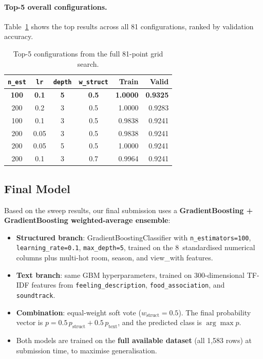 \documentclass[11pt,letterpaper]{article}
\begin{document}
\paragraph{Top-5 overall configurations.}
Table~\ref{tab:top5} shows the top results across all 81 configurations, ranked
by validation accuracy.

\begin{table}[H]
\centering
\caption{Top-5 configurations from the full 81-point grid search.}
\label{tab:top5}
\begin{tabular}{ccccrr}
\toprule
\texttt{n\_est} & \texttt{lr} & \texttt{depth} & \texttt{w\_struct} & \textbf{Train} & \textbf{Valid}\\
\midrule
\textbf{100} & \textbf{0.1} & \textbf{5} & \textbf{0.5} & \textbf{1.0000} & \textbf{0.9325}\\
200  & 0.2  & 3 & 0.5  & 1.0000 & 0.9283 \\
100  & 0.1  & 3 & 0.5  & 0.9838 & 0.9241 \\
200  & 0.05 & 3 & 0.5  & 0.9838 & 0.9241 \\
200  & 0.05 & 5 & 0.5  & 1.0000 & 0.9241 \\
200  & 0.1  & 3 & 0.7  & 0.9964 & 0.9241 \\
\bottomrule
\end{tabular}
\end{table}

\subsection{Final Model}

Based on the sweep results, our final submission uses a
\textbf{GradientBoosting + GradientBoosting weighted-average ensemble}:

\begin{itemize}
  \item \textbf{Structured branch}: GradientBoostingClassifier with
        \texttt{n\_estimators=100}, \texttt{learning\_rate=0.1}, \texttt{max\_depth=5},
        trained on the 8~standardised numerical columns plus multi-hot room, season,
        and view\_with features.
  \item \textbf{Text branch}: same GBM hyperparameters, trained on 300-dimensional
        TF-IDF features from \texttt{feeling\_description}, \texttt{food\_association},
        and \texttt{soundtrack}.
  \item \textbf{Combination}: equal-weight soft vote ($w_{\text{struct}} = 0.5$).
        The final probability vector is
        $p = 0.5\, p_{\text{struct}} + 0.5\, p_{\text{text}}$, and the predicted
        class is $\arg\max p$.
  \item Both models are trained on the \textbf{full available dataset} (all 1{,}583
        rows) at submission time, to maximise generalisation.
\end{itemize}
\end{document}
